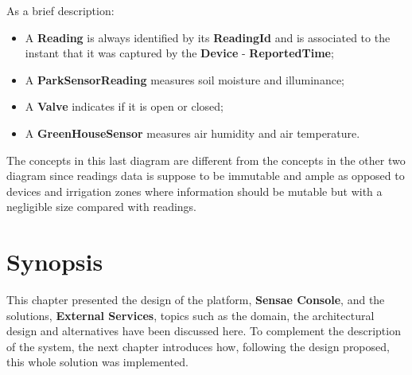 As a brief description:

\begin{itemize}
   \item A \textbf{Reading} is always identified by its \textbf{ReadingId} and is associated to the instant that it was captured by the \textbf{Device} - \textbf{ReportedTime};
   \item A \textbf{ParkSensorReading} measures soil moisture and illuminance;
   \item A \textbf{Valve} indicates if it is open or closed;
   \item A \textbf{GreenHouseSensor} measures air humidity and air temperature.
\end{itemize}

The concepts in this last diagram are different from the concepts in the other two diagram since readings data is suppose to be immutable and ample as opposed to devices and irrigation zones where information should be mutable but with a negligible size compared with readings.
\section{Synopsis}
\label{sec:design:synopsis}

This chapter presented the design of the platform, \textbf{Sensae Console}, and the solutions, \textbf{External Services}, topics such as the domain, the architectural design and alternatives have been discussed here. To complement the description of the system, the next chapter introduces how, following the design proposed, this whole solution was implemented.
